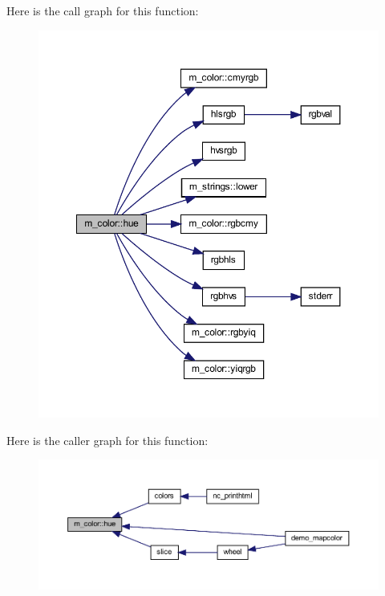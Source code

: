 Here is the call graph for this function\+:
\nopagebreak
\begin{figure}[H]
\begin{center}
\leavevmode
\includegraphics[width=350pt]{namespacem__color_a56dd07bbf1378ccc78a230d171f9d429_cgraph}
\end{center}
\end{figure}
Here is the caller graph for this function\+:
\nopagebreak
\begin{figure}[H]
\begin{center}
\leavevmode
\includegraphics[width=350pt]{namespacem__color_a56dd07bbf1378ccc78a230d171f9d429_icgraph}
\end{center}
\end{figure}
\mbox{\label{namespacem__color_a334ec90d94bbfb9a4c08c5f9efdb8c47}} 
